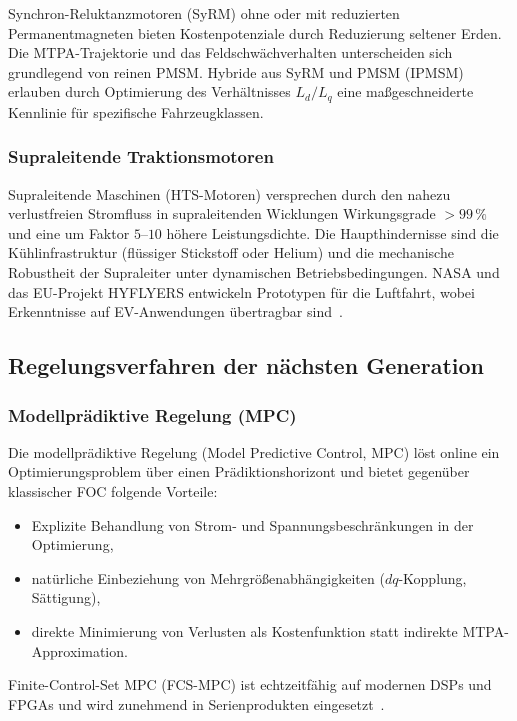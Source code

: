 ﻿\documentclass[a4paper,12pt]{article}
\theoremstyle{definition}
\begin{document}
Synchron-Reluktanzmotoren (SyRM) ohne oder mit reduzierten Permanentmagneten
bieten Kostenpotenziale durch Reduzierung seltener Erden. Die MTPA-Trajektorie
und das Feldschwächverhalten unterscheiden sich grundlegend von reinen PMSM.
Hybride aus SyRM und PMSM (IPMSM) erlauben durch Optimierung des Verhältnisses
$L_d/L_q$ eine maßgeschneiderte Kennlinie für spezifische Fahrzeugklassen.

\subsubsection{Supraleitende Traktionsmotoren}

Supraleitende Maschinen (HTS-Motoren) versprechen durch den nahezu verlustfreien
Stromfluss in supraleitenden Wicklungen Wirkungsgrade $> 99\,\%$ und eine um
Faktor $5$--$10$ höhere Leistungsdichte. Die Haupthindernisse sind die
Kühlinfrastruktur (flüssiger Stickstoff oder Helium) und die mechanische
Robustheit der Supraleiter unter dynamischen Betriebsbedingungen. NASA und
das EU-Projekt HYFLYERS entwickeln Prototypen für die Luftfahrt, wobei
Erkenntnisse auf EV-Anwendungen übertragbar sind~\cite{filippenko2017superconducting}.

\subsection{Regelungsverfahren der nächsten Generation}

\subsubsection{Modellprädiktive Regelung (MPC)}

Die modellprädiktive Regelung (Model Predictive Control, MPC) löst online ein
Optimierungsproblem über einen Prädiktionshorizont und bietet gegenüber
klassischer FOC folgende Vorteile:
\begin{itemize}
    \item Explizite Behandlung von Strom- und Spannungsbeschränkungen
          in der Optimierung,
    \item natürliche Einbeziehung von Mehrgrößenabhängigkeiten
          ($dq$-Kopplung, Sättigung),
    \item direkte Minimierung von Verlusten als Kostenfunktion
          statt indirekte MTPA-Approximation.
\end{itemize}
Finite-Control-Set MPC (FCS-MPC) ist echtzeitfähig auf modernen DSPs und FPGAs
und wird zunehmend in Serienprodukten eingesetzt~\cite{rodriguez2013mpc}.
\end{document}
